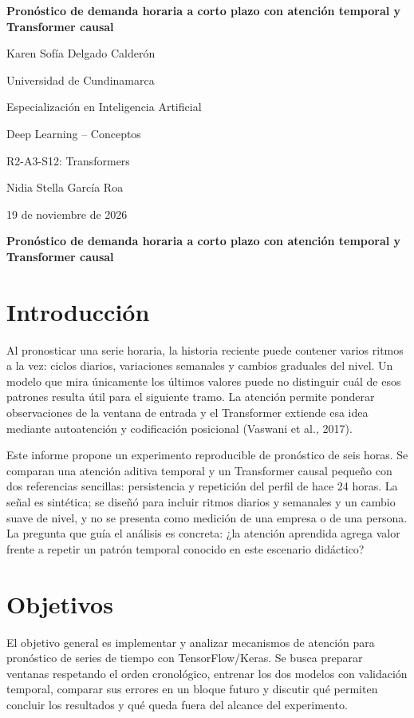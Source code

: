 \documentclass[12pt]{article}
\newcommand{\student}{Karen Sofía Delgado Calderón}
\begin{document}
\begin{titlepage}
\thispagestyle{empty}\centering
\vspace*{1.2in}
{\bfseries Pronóstico de demanda horaria a corto plazo con atención temporal y Transformer causal\par}
\vspace{1.15in}
\student\par
Universidad de Cundinamarca\par
Especialización en Inteligencia Artificial\par
Deep Learning -- Conceptos\par
R2-A3-S12: Transformers\par
Nidia Stella García Roa\par
19 de noviembre de 2026\par
\vfill
\end{titlepage}
\setcounter{page}{2}

\begin{center}\textbf{Pronóstico de demanda horaria a corto plazo con atención temporal y Transformer causal}\end{center}

\section{Introducción}
Al pronosticar una serie horaria, la historia reciente puede contener varios ritmos a la vez: ciclos diarios, variaciones semanales y cambios graduales del nivel. Un modelo que mira únicamente los últimos valores puede no distinguir cuál de esos patrones resulta útil para el siguiente tramo. La atención permite ponderar observaciones de la ventana de entrada y el Transformer extiende esa idea mediante autoatención y codificación posicional (Vaswani et al., 2017).

Este informe propone un experimento reproducible de pronóstico de seis horas. Se comparan una atención aditiva temporal y un Transformer causal pequeño con dos referencias sencillas: persistencia y repetición del perfil de hace 24 horas. La señal es sintética; se diseñó para incluir ritmos diarios y semanales y un cambio suave de nivel, y no se presenta como medición de una empresa o de una persona. La pregunta que guía el análisis es concreta: ¿la atención aprendida agrega valor frente a repetir un patrón temporal conocido en este escenario didáctico?

\section{Objetivos}
El objetivo general es implementar y analizar mecanismos de atención para pronóstico de series de tiempo con TensorFlow/Keras. Se busca preparar ventanas respetando el orden cronológico, entrenar los dos modelos con validación temporal, comparar sus errores en un bloque futuro y discutir qué permiten concluir los resultados y qué queda fuera del alcance del experimento.
\end{document}
